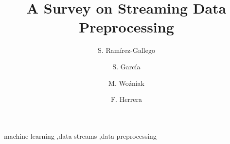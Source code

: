 \documentclass[preprint,12pt]{elsarticle}
\begin{document}
\begin{frontmatter}



\title{A Survey on Streaming Data Preprocessing}


\author[ugr]{S. Ram\'{i}rez-Gallego}

\author[ugr]{S. Garc\'ia}

\author[pwr]{M. Wo\'zniak}

\author[ugr]{F. Herrera}

\address[ugr]{Department of Computer Science and Artificial Intelligence, CITIC-UGR, University of Granada, 18071 Granada, Spain}
	
\address[pwr]{Department of Computer Science, Wroc\l{}aw University of Technology, Wyb. Wyspianskiego 27, 50-370 Wroc\l{}aw, Poland}


\begin{abstract}

\end{abstract}

\begin{keyword}



machine learning \sep data streams \sep data preprocessing

\end{keyword}

\end{frontmatter}
\end{document}
